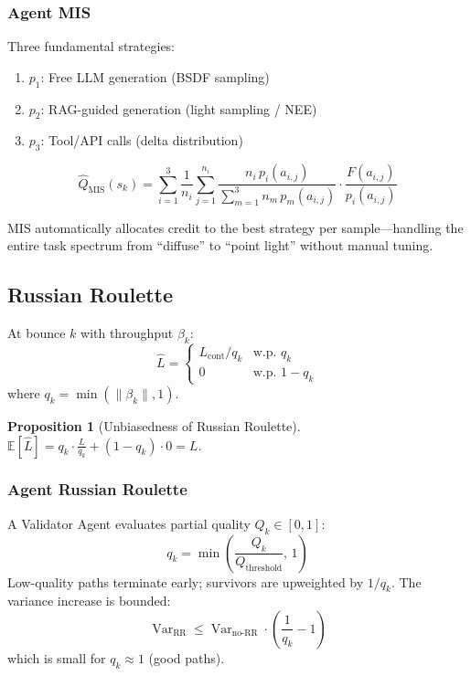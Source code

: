 \documentclass[11pt,twocolumn]{article}
\newtheorem{proposition}[theorem]{Proposition}
\theoremstyle{definition}
\newcommand{\E}{\mathbb{E}}
\newcommand{\Var}{\operatorname{Var}}
\begin{document}
\subsubsection{Agent MIS}

Three fundamental strategies:
\begin{enumerate}[nosep]
  \item $p_1$: Free LLM generation (BSDF sampling)
  \item $p_2$: RAG-guided generation (light sampling / NEE)
  \item $p_3$: Tool/API calls (delta distribution)
\end{enumerate}
\begin{equation}\label{eq:agent-mis}
  \hat{Q}_{\text{MIS}}(s_k) = \sum_{i=1}^{3} \frac{1}{n_i}
    \sum_{j=1}^{n_i}
    \frac{n_i\,p_i(a_{i,j})}{\sum_{m=1}^{3} n_m\,p_m(a_{i,j})}
    \cdot \frac{F(a_{i,j})}{p_i(a_{i,j})}
\end{equation}

MIS automatically allocates credit to the best strategy per sample---handling
the entire task spectrum from ``diffuse'' to ``point light'' without manual tuning.

\subsection{Russian Roulette}\label{sec:rr}

At bounce $k$ with throughput $\beta_k$:
\begin{equation}\label{eq:rr}
  \hat{L} = \begin{cases}
    L_{\text{cont}} / q_k & \text{w.p.\ } q_k \\
    0 & \text{w.p.\ } 1-q_k
  \end{cases}
\end{equation}
where $q_k = \min(\|\beta_k\|, 1)$.

\begin{proposition}[Unbiasedness of Russian Roulette]\label{prop:rr-unbiased}
$\E[\hat{L}] = q_k \cdot \frac{L}{q_k} + (1-q_k) \cdot 0 = L$.
\end{proposition}

\subsubsection{Agent Russian Roulette}

A Validator Agent evaluates partial quality $Q_k \in [0,1]$:
\begin{equation}\label{eq:agent-rr}
  q_k = \min\!\left(\frac{Q_k}{Q_{\text{threshold}}},\,1\right)
\end{equation}
Low-quality paths terminate early; survivors are upweighted by $1/q_k$.
The variance increase is bounded:
\begin{equation}\label{eq:rr-var-bound}
  \Var_{\text{RR}} \leq \Var_{\text{no-RR}} \cdot \left(\frac{1}{q_k} - 1\right)
\end{equation}
which is small for $q_k \approx 1$ (good paths).
\end{document}
